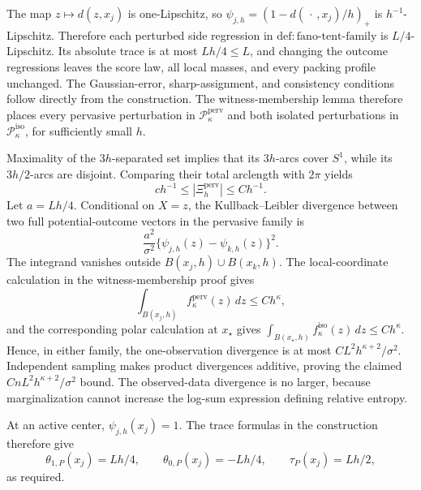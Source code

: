 The map \(z\mapsto d(z,x_j)\) is one-Lipschitz, so \(\psi_{j,h}=(1-d(\,\cdot\,,x_j)/h)_+\) is \(h^{-1}\)-Lipschitz. Therefore each perturbed side regression in \(\mathrm{def:fano\text{-}tent\text{-}family}\) is \(L/4\)-Lipschitz. Its absolute trace is at most \(Lh/4\le L\), and changing the outcome regressions leaves the score law, all local masses, and every packing profile unchanged. The Gaussian-error, sharp-assignment, and consistency conditions follow directly from the construction. The witness-membership lemma therefore places every pervasive perturbation in \(\mathcal P_{\kappa}^{\mathrm{perv}}\) and both isolated perturbations in \(\mathcal P_{\kappa}^{\mathrm{iso}}\), for sufficiently small \(h\).

Maximality of the \(3h\)-separated set implies that its \(3h\)-arcs cover \(S^1\), while its \(3h/2\)-arcs are disjoint. Comparing their total arclength with \(2\pi\) yields
\[
 c h^{-1}\le |\Xi_h^{\mathrm{perv}}|\le C h^{-1}.
\]
Let \(a=Lh/4\). Conditional on \(X=z\), the Kullback--Leibler divergence between two full potential-outcome vectors in the pervasive family is
\[
 \frac{a^2}{\sigma^2}\{\psi_{j,h}(z)-\psi_{k,h}(z)\}^2.
\]
The integrand vanishes outside \(B(x_j,h)\cup B(x_k,h)\). The local-coordinate calculation in the witness-membership proof gives
\[
 \int_{B(x_j,h)} f_\kappa^{\mathrm{perv}}(z)\,dz\le Ch^\kappa,
\]
and the corresponding polar calculation at \(x_\star\) gives \(\int_{B(x_\star,h)}f_\kappa^{\mathrm{iso}}(z)\,dz\le Ch^\kappa\). Hence, in either family, the one-observation divergence is at most \(CL^2h^{\kappa+2}/\sigma^2\). Independent sampling makes product divergences additive, proving the claimed \(CnL^2h^{\kappa+2}/\sigma^2\) bound. The observed-data divergence is no larger, because marginalization cannot increase the log-sum expression defining relative entropy.

At an active center, \(\psi_{j,h}(x_j)=1\). The trace formulas in the construction therefore give
\[
 \theta_{1,P}(x_j)=Lh/4,\qquad
 \theta_{0,P}(x_j)=-Lh/4,
 \qquad \tau_P(x_j)=Lh/2,
\]
as required.